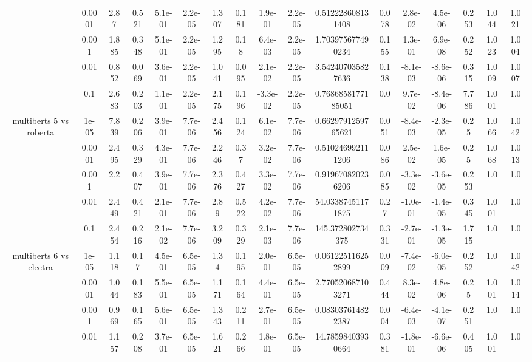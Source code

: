 \begin{tabular}{|c|c|c|c|c|c|c|c|c|c|c|c|c|c|c|c|c|}
 & 0.0001 & 2.87 & 0.521 & 5.1e-01 & 2.2e-05 & 1.307 & 0.181 & 1.9e-01 & 2.2e-05 & 0.512228608131408 & 0.078 & 2.8e-02 & 4.5e-06 & 0.253 & 1.044 & 1.021 \\
 & 0.001 & 1.885 & 0.348 & 5.1e-01 & 2.2e-05 & 1.295 & 0.18 & 6.4e-03 & 2.2e-05 & 1.703975677490234 & 0.155 & 1.3e-01 & 6.9e-08 & 0.252 & 1.023 & 1.004 \\
 & 0.01 & 0.852 & 0.069 & 3.6e-01 & 2.2e-05 & 1.041 & 0.095 & 2.1e-02 & 2.2e-05 & 3.542407035827636 & 0.138 & -8.1e-03 & -8.6e-06 & 0.315 & 1.009 & 1.007 \\
 & 0.1 & 2.683 & 0.203 & 1.1e-01 & 2.2e-05 & 2.175 & 0.196 & -3.3e-02 & 2.2e-05 & 0.7686858177185051 & 0.0 & 9.7e-02 & -8.4e-06 & 7.786 & 1.001 & 1.0 \\
\hline
\multirow{5}{*}{multiberts 5 vs roberta } & 1e-05 & 7.839 & 0.206 & 3.9e-01 & 7.7e-06 & 2.456 & 0.124 & 6.1e-02 & 7.7e-06 & 0.6629791259765621 & 0.051 & -8.4e-03 & -2.3e-05 & 0.25 & 1.066 & 1.042 \\
 & 0.0001 & 2.495 & 0.329 & 4.3e-01 & 7.7e-06 & 2.246 & 0.37 & 3.2e-02 & 7.7e-06 & 0.510246992111206 & 0.086 & 2.5e-02 & 1.6e-05 & 0.25 & 1.068 & 1.013 \\
 & 0.001 & 2.2 & 0.407 & 3.9e-01 & 7.7e-06 & 2.376 & 0.427 & 3.3e-02 & 7.7e-06 & 0.919670820236206 & 0.085 & -3.3e-02 & -3.6e-05 & 0.253 & 1.0 & 1.0 \\
 & 0.01 & 2.449 & 0.421 & 2.1e-01 & 7.7e-06 & 2.89 & 0.522 & 4.2e-02 & 7.7e-06 & 54.03387451171875 & 0.27 & -1.0e-01 & -1.4e-05 & 0.345 & 1.001 & 1.0 \\
 & 0.1 & 2.454 & 0.216 & 2.1e-02 & 7.7e-06 & 3.209 & 0.329 & 2.1e-03 & 7.7e-06 & 145.372802734375 & 0.331 & -2.7e-01 & -1.3e-05 & 1.715 & 1.0 & 1.0 \\
\hline
\multirow{5}{*}{multiberts 6 vs electra } & 1e-05 & 1.118 & 0.17 & 4.5e-01 & 6.5e-05 & 1.34 & 0.195 & 2.0e-01 & 6.5e-05 & 0.061225116252899 & 0.009 & -7.4e-02 & -6.0e-05 & 0.252 & 1.0 & 1.042 \\
 & 0.0001 & 1.044 & 0.183 & 5.5e-01 & 6.5e-05 & 1.171 & 0.164 & 4.4e-01 & 6.5e-05 & 2.770520687103271 & 0.444 & 8.3e-02 & 4.8e-06 & 0.25 & 1.001 & 1.014 \\
 & 0.001 & 0.969 & 0.165 & 5.6e-01 & 6.5e-05 & 1.343 & 0.211 & 2.7e-01 & 6.5e-05 & 0.083037614822387 & 0.004 & -6.4e-03 & -4.1e-07 & 0.251 & 1.0 & 1.0 \\
 & 0.01 & 1.157 & 0.208 & 3.7e-01 & 6.5e-05 & 1.621 & 0.266 & 1.8e-01 & 6.5e-05 & 14.78598403930664 & 0.381 & -1.8e-01 & -6.6e-06 & 0.405 & 1.001 & 1.0 \\

\end{tabular}
